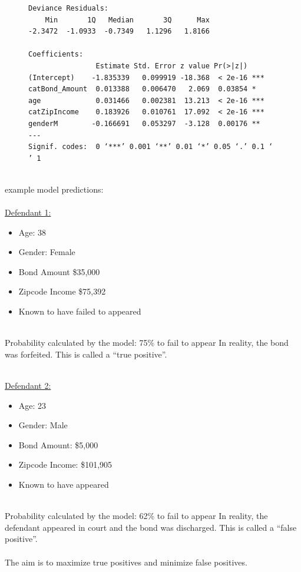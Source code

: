 \documentclass{article}
\begin{document}
\begin{figure}[H]
\centering
\begin{BVerbatim}
Deviance Residuals: 
    Min       1Q   Median       3Q      Max  
-2.3472  -1.0933  -0.7349   1.1296   1.8166  

Coefficients:
                Estimate Std. Error z value Pr(>|z|)    
(Intercept)    -1.835339   0.099919 -18.368  < 2e-16 ***
catBond_Amount  0.013388   0.006470   2.069  0.03854 *  
age             0.031466   0.002381  13.213  < 2e-16 ***
catZipIncome    0.183926   0.010761  17.092  < 2e-16 ***
genderM        -0.166691   0.053297  -3.128  0.00176 ** 
---
Signif. codes:  0 ‘***’ 0.001 ‘**’ 0.01 ‘*’ 0.05 ‘.’ 0.1 ‘ ’ 1
\end{BVerbatim}
\end{figure}

%
~\\
example model predictions:
~\\
~\\
\underline{Defendant 1:}
~\\
\begin{itemize}
\item Age: 38
\item Gender: Female 
\item Bond Amount \$35,000
\item Zipcode Income  \$75,392
\item Known to have failed to appeared
\end{itemize}
~\\
Probability calculated by the model: 75\% to fail to appear
In reality, the bond was forfeited. This is called a ``true positive''.


~\\
\underline{Defendant 2:}
~\\
\begin{itemize}
\item Age:             23   
\item Gender:          Male
\item Bond Amount:    \$5,000
\item Zipcode Income: \$101,905
\item Known to have appeared
\end{itemize}
~\\
Probability calculated by the model: 62\% to fail to appear
In reality, the defendant appeared in court and the bond was discharged. 
This is called a ``false positive''.
~\\
~\\
The aim is to maximize true positives and minimize false positives. 
\end{document}
